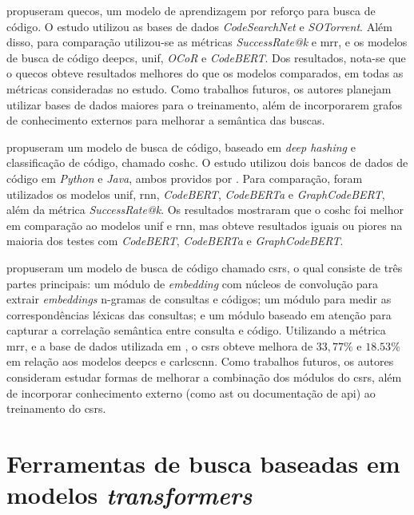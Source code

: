 \textcite{Wang2022EnrichingQS} propuseram \gls{quecos}, um modelo de aprendizagem por reforço para busca de código. O estudo utilizou as bases de dados \textit{CodeSearchNet} \cite{Husain2019CodeSearchNetCE} e \textit{SOTorrent}. Além disso, para comparação utilizou-se as métricas \textit{SuccessRate@k} e \gls{mrr}, e os modelos de busca de código \gls{deepcs}, \gls{unif}, \textit{OCoR} e \textit{CodeBERT}. Dos resultados, nota-se que o \gls{quecos} obteve resultados melhores do que os modelos comparados, em todas as métricas consideradas no estudo. Como trabalhos futuros, os autores planejam utilizar bases de dados maiores para o treinamento, além de incorporarem grafos de conhecimento externos para melhorar a semântica das buscas.

\textcite{Gu2022AcceleratingCS} propuseram um modelo de busca de código, baseado em \textit{deep hashing} e classificação de código, chamado \gls{coshc}. O estudo utilizou dois bancos de dados de código em \textit{Python} e \textit{Java}, ambos providos por \cite{Feng2020CodeBERTAP}. Para comparação, foram utilizados os modelos \gls{unif}, \gls{rnn}, \textit{CodeBERT}, \textit{CodeBERTa} e \textit{GraphCodeBERT}, além da métrica \textit{SuccessRate@k}. Os resultados mostraram que o \gls{coshc} foi melhor em comparação ao modelos \gls{unif} e \gls{rnn}, mas obteve resultados iguais ou piores na maioria dos testes com \textit{CodeBERT}, \textit{CodeBERTa} e \textit{GraphCodeBERT}.

\textcite{Cheng2022CSRSCS} propuseram um modelo de busca de código chamado \gls{csrs}, o qual consiste de três partes principais: um módulo de \textit{embedding} com núcleos de convolução para extrair \textit{embeddings} n-gramas de consultas e códigos; um módulo para medir as correspondências léxicas das consultas; e um módulo baseado em atenção para capturar a correlação semântica entre consulta e código. Utilizando a métrica \gls{mrr}, e a base de dados utilizada em \cite{Gu2018DeepCS}, o \gls{csrs} obteve melhora de $33,77\%$ e $18.53\%$ em relação aos modelos \gls{deepcs} e \gls{carlcscnn}. Como trabalhos futuros, os autores consideram estudar formas de melhorar a combinação dos módulos do \gls{csrs}, além de incorporar conhecimento externo (como \gls{ast} ou documentação de \gls{api}) ao treinamento do \gls{csrs}.

\section{Ferramentas de busca baseadas em modelos \textit{transformers}}

